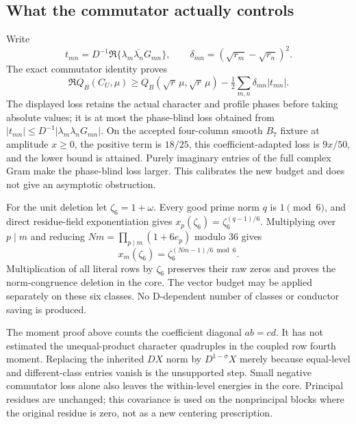 \documentclass[11pt,oneside,openany]{book}
\theoremstyle{definition}\newtheorem{definition}[theorem]{Definition}
\theoremstyle{remark}\newtheorem{remark}[theorem]{Remark}
\begin{document}
\subsection{What the commutator actually controls}
Write
\[
 t_{mn}=D^{-1}\Re\{\lambda_m\overline{\lambda_n}G_{mn}\},\qquad
 \delta_{mn}=(\sqrt{r_m}-\sqrt{r_n})^2.
\]
The exact commutator identity proves
\[
 \Re Q_B(C_U,\mu)\ge
 Q_B(\sqrt r\,\mu,\sqrt r\,\mu)
 -\tfrac12\sum_{m,n}\delta_{mn}|t_{mn}|.
\]
The displayed loss retains the actual character and profile phases before
taking absolute values; it is at most the phase-blind loss obtained from
$|t_{mn}|\le D^{-1}|\lambda_m\lambda_nG_{mn}|$.
On the accepted four-column smooth $B_7$ fixture at amplitude $x\ge0$,
the positive term is $18/25$, this coefficient-adapted loss is $9x/50$,
and the lower bound is attained. Purely imaginary entries of the full
complex Gram make the phase-blind loss larger. This calibrates the new
budget and does not give an asymptotic obstruction.

For the unit deletion let $\zeta_6=1+\omega$. Every good prime norm $q$
is $1\pmod6$, and direct residue-field exponentiation gives
$x_p(\zeta_6)=\zeta_6^{(q-1)/6}$. Multiplying over $p\mid m$ and reducing
$Nm=\prod_{p\mid m}(1+6e_p)$ modulo $36$ gives
\[
 x_m(\zeta_6)=\zeta_6^{(Nm-1)/6\bmod6}.
\]
Multiplication of all literal rows by $\zeta_6$ preserves their raw zeros
and proves the norm-congruence deletion in the core. The vector budget
may be applied separately on these six classes. No D-dependent number
of classes or conductor saving is produced.

The moment proof above counts the coefficient diagonal $ab=cd$.
It has not estimated the unequal-product character quadruples in the
coupled row fourth moment. Replacing the inherited $DX$ norm by
$D^{1-\sigma}X$ merely because equal-level and different-class entries
vanish is the unsupported step. Small negative commutator loss alone
also leaves the within-level energies in the core. Principal residues
are unchanged; this covariance is used on the nonprincipal blocks where
the original residue is zero, not as a new centering prescription.
\end{document}
